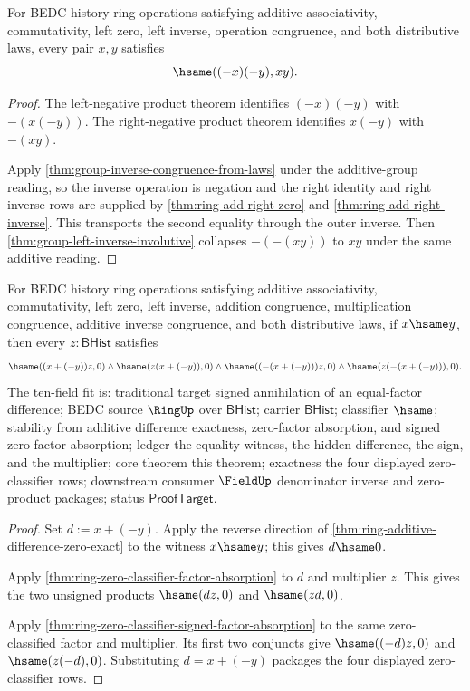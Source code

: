 \begin{theorem}
\label{thm:ring-mul-neg-neg-eq-mul}
For BEDC history ring operations satisfying additive associativity,
commutativity, left zero, left inverse, operation congruence, and both
distributive laws, every pair $x,y$ satisfies
$$
\hsame((-x)(-y),xy).
$$
\end{theorem}
\begin{proof}
The left-negative product theorem identifies $(-x)(-y)$ with $-(x(-y))$.
The right-negative product theorem identifies $x(-y)$ with $-(xy)$.

Apply \autoref{thm:group-inverse-congruence-from-laws} under the additive-group
reading, so the inverse operation is negation and the right identity and right
inverse rows are supplied by \autoref{thm:ring-add-right-zero} and
\autoref{thm:ring-add-right-inverse}. This transports the second equality
through the outer inverse. Then \autoref{thm:group-left-inverse-involutive}
collapses $-(-(xy))$ to $xy$ under the same additive reading.
\end{proof}

\begin{theorem}
\label{thm:ring-equal-factor-signed-difference-annihilation}
For BEDC history ring operations satisfying additive associativity,
commutativity, left zero, left inverse, addition congruence, multiplication
congruence, additive inverse congruence, and both distributive laws, if
$x\hsame y$, then every $z:\mathsf{BHist}$ satisfies
$$
\hsame((x+(-y))z,0)\land \hsame(z(x+(-y)),0)\land
\hsame((-(x+(-y)))z,0)\land \hsame(z(-(x+(-y))),0).
$$
The ten-field fit is: traditional target signed annihilation of an
equal-factor difference; BEDC source $\RingUp$ over $\mathsf{BHist}$; carrier
$\mathsf{BHist}$; classifier $\hsame$; stability from additive difference
exactness, zero-factor absorption, and signed zero-factor absorption; ledger
the equality witness, the hidden difference, the sign, and the multiplier;
core theorem this theorem; exactness the four displayed zero-classifier rows;
downstream consumer $\FieldUp$ denominator inverse and zero-product packages;
status $\mathsf{ProofTarget}$.
\end{theorem}
\begin{proof}
Set $d:=x+(-y)$. Apply the reverse direction of
\autoref{thm:ring-additive-difference-zero-exact} to the witness $x\hsame y$;
this gives $d\hsame0$.

Apply \autoref{thm:ring-zero-classifier-factor-absorption} to $d$ and
multiplier $z$. This gives the two unsigned products $\hsame(dz,0)$ and
$\hsame(zd,0)$.

Apply \autoref{thm:ring-zero-classifier-signed-factor-absorption} to the same
zero-classified factor and multiplier. Its first two conjuncts give
$\hsame((-d)z,0)$ and $\hsame(z(-d),0)$. Substituting $d=x+(-y)$ packages the
four displayed zero-classifier rows.
\end{proof}

